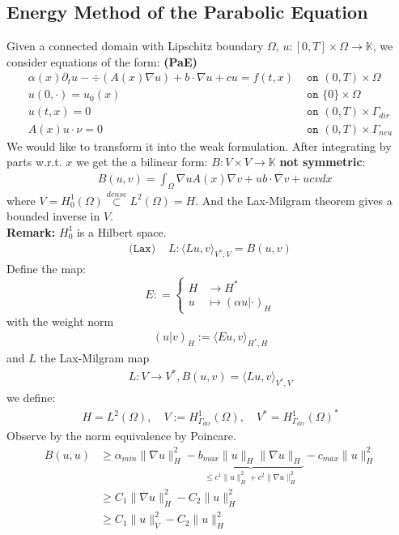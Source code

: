 \subsection{Energy Method of the Parabolic Equation }
Given a connected domain with Lipschitz boundary $\Omega$, $u: [0, T] \times \Omega \rightarrow \mathbb{K}$,  we consider equations of the form: \textbf{(PaE)}
 \begin{equation}  
 \begin{aligned}
 	\alpha(x) \partial_t u - \div(A(x)\nabla u) + b \cdot \nabla u + c u = f(t, x)   &\texttt{ on }(0, T) \times \Omega \\
 	u(0, \cdot) = u_0(x) &\texttt{ on } \{0\} \times \Omega \\
 	u(t, x) = 0 &\texttt{ on }(0, T) \times \Gamma_{dir}\\
 	A(x) u\cdot \nu = 0 &\texttt{ on } (0, T) \times \Gamma_{neu}
 \end{aligned}	
 \end{equation}
 We would like to transform it into the weak formulation. After integrating by parts w.r.t. $x$ we get the a bilinear form: $B: V \times V \rightarrow \mathbb{K}$ \textbf{not symmetric}:
 \begin{align*}
 	&B(u, v) = \int_\Omega \nabla u A(x) \nabla v + u b \cdot \nabla v + ucv dx 
 \end{align*}
 where $V = H_0^1(\Omega) \overset{dense}{\subset} L^2(\Omega) = H$. And the Lax-Milgram theorem gives a bounded inverse in $V$. \\
 \textbf{Remark:} $H^1_0$ is a Hilbert space.
 \begin{align*}
 	\texttt{(Lax) }
 	&L :  \langle Lu , v \rangle_{V^*, V} = B(u, v)
 \end{align*}
 Define the map:
 \begin{equation*}
 E: = \left\{
 \begin{aligned}
 	H &\rightarrow H^*\\
 	u &\mapsto (\alpha u|\cdot)_H
 \end{aligned}
 \right.
 \end{equation*}
 with the weight norm
 \begin{align*}
 	 (u|v)_H := \langle Eu, v \rangle_{H^*, H}
 \end{align*}
 and $L$ the Lax-Milgram map
 \begin{align*}
 	L: V \rightarrow V^*, B(u, v) = \langle Lu, v \rangle_{V^*, V}
 \end{align*}
 we define:
 \begin{align*}
 	H= L^2(\Omega), \quad V:= H_{\Gamma_{dir}}^1 (\Omega), \quad V^* = H_{\Gamma_{dir}}^1 (\Omega)^*
 \end{align*}
 Observe by the norm equivalence by Poincare.
 \begin{align*}
 	B(u, u) 
 	&\ge \alpha_{min}\|\nabla u \|_{H}^2 - \underbrace{ b_{max}\|u\|_H \|\nabla u \|_H}_{\le c^1\|u\|_H^2 + c^2 \|\nabla u\|^2_H } - c_{max}\|u\|_H^2 \\
 	&\ge C_1 \| \nabla u\|_H^2  - C_2 \|u\|_H^2\\
 	&\ge C_1 \|u\|_V^2 - C_2 \|u\|_H^2
 \end{align*}
 
